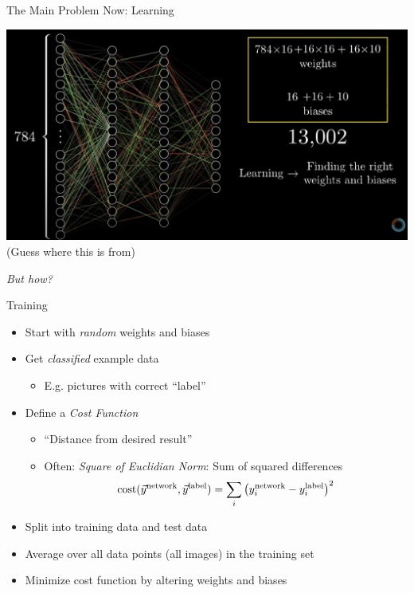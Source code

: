 
\begin{frame}{The Main Problem Now: Learning}
%
\begin{center}
	\includegraphics[width=.7\linewidth]{./gfx/3b1b-network-size}\\
	{\tiny (Guess where this is from)}
	
	\Thus \emph{But how?}
\end{center}
%
\end{frame}


\begin{frame}{Training}
%
\begin{itemize}
\item Start with \emph{random} weights and biases
\item Get \emph{classified} example data
	\begin{itemize}
	\item[\Thus] E.\;g. pictures with correct \enquote{label}
	\end{itemize}
\item Define a \emph{Cost Function}
	\begin{itemize}
	\item \enquote{Distance from desired result}
	\item Often: \emph{Square of Euclidian Norm}: Sum of squared differences
		\[
			\text{cost}(\vec{y}^{\text{network}}, \vec{y}^{\text{label}})
			=
			\sum_i
				\qty(
					y_i^{\text{network}} - y_i^{\text{label}}
				)^2
		\]
	\end{itemize}
\item Split into training data and test data
\item Average over all data points (\eg all images) in the training set
\item Minimize cost function by altering weights and biases
\end{itemize}
%
\end{frame}

